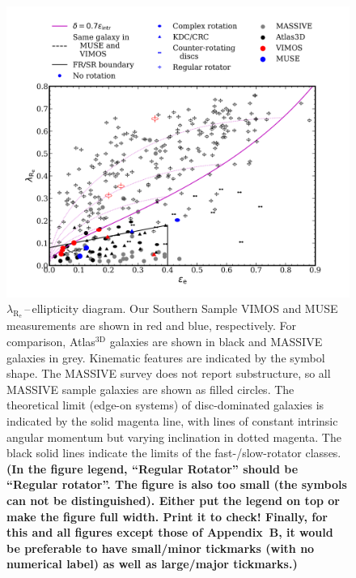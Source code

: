 \documentclass[a4paper,fleqn,usenatbib]{mnras}
\begin{document}
\begin{figure}
  \includegraphics[width=\columnwidth]{lambda_R_ellipticity.png}
  \caption{$\lambda_\mathrm{R_e}$\,--\,ellipticity diagram. Our
    Southern Sample VIMOS and MUSE measurements are shown in red and
    blue, respectively. For comparison, Atlas$^\text{3D}$ galaxies
    \citep{Emsellem2011} are shown in black and MASSIVE galaxies
    \citep{Veale2017} in grey. Kinematic features are indicated by the
    symbol shape. The MASSIVE survey does not report substructure, so
    all MASSIVE sample galaxies are shown as filled circles. The
    theoretical limit (edge-on systems) of disc-dominated galaxies is
    indicated by the solid magenta line, with lines of constant
    intrinsic angular momentum but varying inclination in dotted
    magenta. The black solid lines indicate the limits of the
    fast-/slow-rotator classes. {\bf (In the figure legend, ``Regular
      Rotator'' should be ``Regular rotator''. The figure is also too
      small (the symbols can not be distinguished). Either put the
      legend on top or make the figure full width. Print it to check!
      Finally, for this and all figures except those of Appendix~B, it
      would be preferable to have small/minor tickmarks (with no
      numerical label) as well as large/major tickmarks.)}}
  \label{fig:lambdaR_ellip}
\end{figure}
\end{document}
